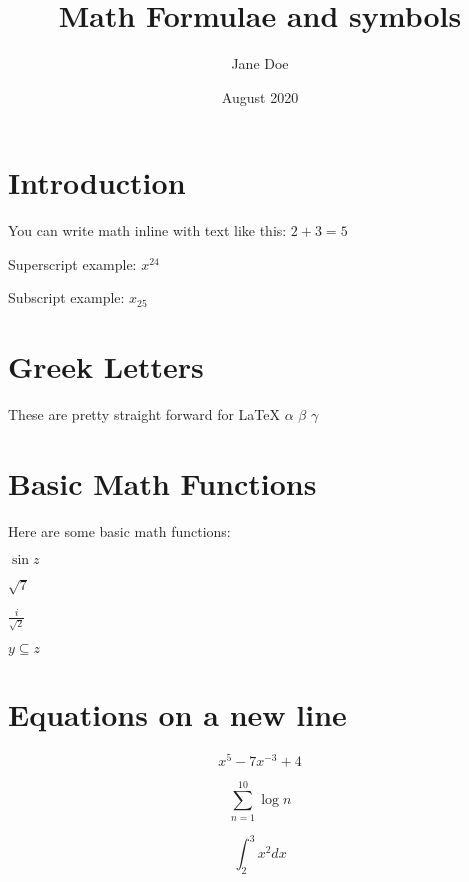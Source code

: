 \documentclass{article}
\title{Math Formulae and symbols}
\author{Jane Doe}
\date{August 2020}
\begin{document}

\section{Introduction}

You can write math inline with text like this: $ 2+3 = 5 $

Superscript example: $ x^{24} $

Subscript example: $ x_{25} $

\section{Greek Letters}
These are pretty straight forward for LaTeX
$\alpha$
$\beta$
$\gamma$

\section{Basic Math Functions}
Here are some  basic math functions:

$\sin{z}$

$\sqrt{7}$

$\frac{i}{\sqrt{2}}$

$y \subseteq z$

\section{Equations on a new line}

\begin{equation}
x^5 - 7x^{-3} + 4
\end{equation}

\begin{equation}
\sum_{n=1}^{10} \log{n}
\end{equation}

\begin{equation*}
\int_{2}^{3} x^2 dx
\end{equation*}
\end{document}
